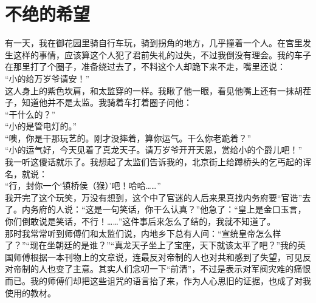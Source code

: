 \fancyhead[RO]{} %
\fancyhead[LE]{} %
\chapter*{不绝的希望}
\thispagestyle{empty}
有一天，我在御花园里骑自行车玩，骑到拐角的地方，几乎撞着一个人。在宫里发生这样的事情，应该算这个人犯了君前失礼的过失，不过我倒没有理会。我的车子在那里打了个圈子，准备绕过去了，不料这个人却跪下来不走，嘴里还说：\\

“小的给万岁爷请安！”\\

这人身上的紫色坎肩，和太监穿的一样。我瞅了他一眼，看见他嘴上还有一抹胡茬子，知道他并不是太监。我骑着车打着圈子问他：\\

“干什么的？”\\

“小的是管电灯的。”\\

“噢，你是干那玩艺的。刚才没摔着，算你运气。干么你老跪着？”\\

“小的运气好，今天见着了真龙天子。请万岁爷开开天恩，赏给小的个爵儿吧！”\\

我一听这傻话就乐了。我想起了太监们告诉我的，北京街上给蹲桥头的乞丐起的诨名，就说：\\

“行，封你一个‘镇桥侯（猴）’吧！哈哈……”\\

我开完了这个玩笑，万没有想到，这个中了官迷的人后来果真找内务府要“官诰”去了。内务府的人说：“这是一句笑话，你干么认真？”他急了：“皇上是金口玉言，你们倒敢说是笑话，不行！……”这件事后来怎么了结的，我就不知道了。\\

那时我常常听到师傅们和太监们说，内地乡下总有人间：“宣统皇帝怎么样了？”“现在坐朝廷的是谁？”“真龙天子坐上了宝座，天下就该太平了吧？”我的英国师傅根据一本刊物上的文章说，连最反对帝制的人也对共和感到了失望，可见反对帝制的人也变了主意。其实人们念叨一下“前清”，不过是表示对军阀灾难的痛恨而已。我的师傅们却把这些诅咒的语言抬了来，作为人心思旧的证据，也成了对我使用的教材。\\

